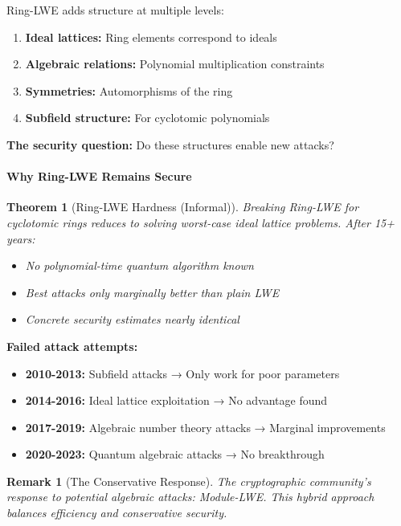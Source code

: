 \documentclass[11pt,a4paper]{article}
\newtheorem{theorem}{Theorem}
\newtheorem{remark}{Remark}
\begin{document}
Ring-LWE adds structure at multiple levels:

\begin{enumerate}
    \item \textbf{Ideal lattices:} Ring elements correspond to ideals
    \item \textbf{Algebraic relations:} Polynomial multiplication constraints  
    \item \textbf{Symmetries:} Automorphisms of the ring
    \item \textbf{Subfield structure:} For cyclotomic polynomials
\end{enumerate}

\textbf{The security question:} Do these structures enable new attacks?

\paragraph{Why Ring-LWE Remains Secure}

\begin{theorem}[Ring-LWE Hardness (Informal)]
Breaking Ring-LWE for cyclotomic rings reduces to solving worst-case ideal lattice problems. After 15+ years:
\begin{itemize}
    \item No polynomial-time quantum algorithm known
    \item Best attacks only marginally better than plain LWE
    \item Concrete security estimates nearly identical
\end{itemize}
\end{theorem}

\textbf{Failed attack attempts:}
\begin{itemize}
    \item \textbf{2010-2013:} Subfield attacks → Only work for poor parameters
    \item \textbf{2014-2016:} Ideal lattice exploitation → No advantage found
    \item \textbf{2017-2019:} Algebraic number theory attacks → Marginal improvements
    \item \textbf{2020-2023:} Quantum algebraic attacks → No breakthrough
\end{itemize}

\begin{remark}[The Conservative Response]
The cryptographic community's response to potential algebraic attacks: Module-LWE. This hybrid approach balances efficiency and conservative security.
\end{remark}
\end{document}
